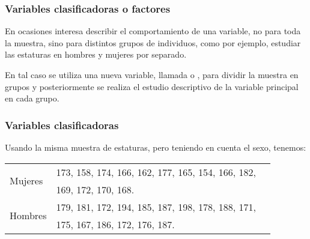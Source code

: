 \begin{frame}
\frametitle{Variables clasificadoras o factores}
En ocasiones interesa describir el comportamiento de una variable, no para toda la muestra, sino para distintos grupos de individuos, como por ejemplo, estudiar las estaturas en hombres y mujeres por separado. 

En tal caso se utiliza una nueva variable, llamada  o , para dividir la muestra en grupos y posteriormente se realiza el estudio descriptivo de la variable principal en cada grupo.
\end{frame}


\begin{frame}
\frametitle{Variables clasificadoras}
Usando la misma muestra de estaturas, pero teniendo en cuenta el sexo, tenemos:
\begin{center}
\begin{tabular}{lll}
\hline
\multirow{2}{*}{Mujeres} &
173, 158, 174, 166, 162, 177, 165, 154, 166, 182, \\
& 169, 172, 170, 168. \\
\hline
\multirow{2}{*}{Hombres} &
179, 181, 172, 194, 185, 187, 198, 178, 188, 171,\\ 
& 175, 167, 186, 172, 176, 187. \\
\hline
\end{tabular}
\end{center}
\begin{center}
\scalebox{0.5}{}
\quad
\scalebox{0.5}{}
\end{center}

\end{frame}